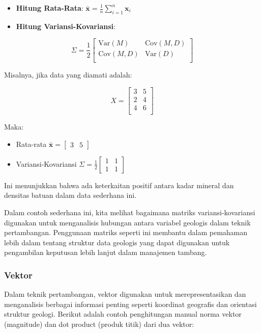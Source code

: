 \documentclass[
]{book}
\begin{document}
\begin{itemize}
\item
  \textbf{Hitung Rata-Rata}: \(\bar{\mathbf{x}} = \frac{1}{n} \sum_{i=1}^{n} \mathbf{x}_i\)
\item
  \textbf{Hitung Variansi-Kovariansi}:
\end{itemize}

\[
\Sigma = \frac{1}{2} \begin{bmatrix}
\text{Var}(M) & \text{Cov}(M,D) \\
\text{Cov}(M,D) & \text{Var}(D) \\
\end{bmatrix}
\]

Misalnya, jika data yang diamati adalah:

\[
X = \begin{bmatrix}
3 & 5 \\
2 & 4 \\
4 & 6 \\
\end{bmatrix}
\]

Maka:

\begin{itemize}
\item
  Rata-rata \(\bar{\mathbf{x}} = \begin{bmatrix} 3 & 5 \end{bmatrix}\)
\item
  Variansi-Kovariansi \(\Sigma = \frac{1}{2} \begin{bmatrix} 1 & 1 \\ 1 & 1 \end{bmatrix}\)
\end{itemize}

Ini menunjukkan bahwa ada keterkaitan positif antara kadar mineral dan densitas batuan dalam data sederhana ini.

Dalam contoh sederhana ini, kita melihat bagaimana matriks variansi-kovariansi digunakan untuk menganalisis hubungan antara variabel geologis dalam teknik pertambangan. Penggunaan matriks seperti ini membantu dalam pemahaman lebih dalam tentang struktur data geologis yang dapat digunakan untuk pengambilan keputusan lebih lanjut dalam manajemen tambang.

\subsubsection*{Vektor}\label{vektor}

Dalam teknik pertambangan, vektor digunakan untuk merepresentasikan dan menganalisis berbagai informasi penting seperti koordinat geografis dan orientasi struktur geologi. Berikut adalah contoh penghitungan manual norma vektor (magnitude) dan dot product (produk titik) dari dua vektor:
\end{document}
